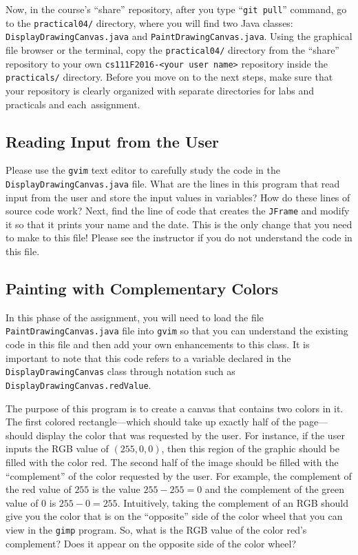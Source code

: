 Now, in the course's ``share'' repository, after you type ``{\tt git pull}'' command, go to the {\tt practical04/}
directory, where you will find two Java classes: {\tt DisplayDrawingCanvas.java} and {\tt PaintDrawingCanvas.java}.
Using the graphical file browser or the terminal, copy the {\tt practical04/} directory from the ``share''
repository to your own {\tt cs111F2016-<your user name>} repository inside the {\tt practicals/} directory. Before you
move on to the next steps, make sure that your repository is clearly organized with separate directories for labs and
practicals and \mbox{each assignment}.

\vspace*{-.1in}
\subsection*{Reading Input from the User}

Please use the {\tt gvim} text editor to carefully study the code in the {\tt DisplayDrawingCanvas.java} file. What are
the lines in this program that read input from the user and store the input values in variables? How do these lines of
source code work? Next, find the line of code that creates the {\tt JFrame} and modify it so that it prints your name
and the date. This is the only change that you need to make to this file! Please see the instructor if you do not
understand the code in this file.

\vspace*{-.2in}
\subsection*{Painting with Complementary Colors}

In this phase of the assignment, you will need to load the file {\tt PaintDrawingCanvas.java} file into {\tt gvim} so
that you can understand the existing code in this file and then add your own enhancements to this class. It is important
to note that this code refers to a variable declared in the {\tt DisplayDrawingCanvas} class through notation such as
{\tt DisplayDrawingCanvas.redValue}.

The purpose of this program is to create a canvas that contains two colors in it. The first colored rectangle---which
should take up exactly half of the page---should display the color that was requested by the user. For instance, if the
user inputs the RGB value of $(255,0,0)$, then this region of the graphic should be filled with the color red. The
second half of the image should be filled with the ``complement'' of the color requested by the user. For example, the
complement of the red value of $255$ is the value $255-255=0$ and the complement of the green value of $0$ is
$255-0=255$. Intuitively, taking the complement of an RGB should give you the color that is on the ``opposite'' side of
the color wheel that you can view in the {\tt gimp} program. So, what is the RGB value of the color red's complement?
Does it appear on the opposite side of the color wheel?

